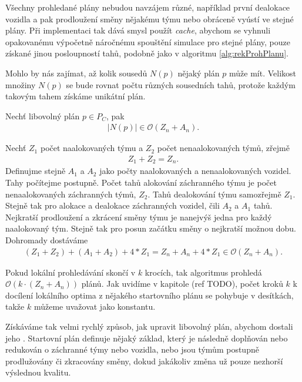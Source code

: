Všechny prohledané plány nebudou navzájem různé,
například první dealokace vozidla a pak prodloužení směny nějakému týmu nebo obráceně vyústí ve stejné plány.
Při implementaci tak dává smysl použít \textit{cache},
abychom se vyhnuli opakovanému výpočetně náročnému spouštění simulace pro stejné plány, pouze získané jinou posloupností tahů, podobně jako v algoritmu \ref{alg:rekProhPlanu}.

Mohlo by nás zajímat, až kolik sousedů $N(p)$ nějaký plán $p$ může mít.
Velikost množiny $N(p)$ se bude rovnat počtu různých sousedních tahů, 
protože každým takovým tahem získáme unikátní plán. 

\begin{veta}
  Nechť libovolný plán $p \in P_C$, pak
  \begin{align*}
    |N(p)| \in \mathcal{O}(Z_n + A_n).
  \end{align*}
\end{veta}
\begin{dukaz}
  Nechť $Z_1$ počet naalokovaných týmu a $Z_2$ počet nenaalokovaných týmů, zřejmě
  \begin{align*}
    Z_1 + Z_2 = Z_n.
  \end{align*}
  Definujme stejně $A_1$ a $A_2$ jako počty naalokovaných a nenaalokovaných vozidel.
  Tahy počítejme postupně.
  Počet tahů alokování záchranného týmu je počet nenaalokovaných záchranných týmů, $Z_2$.
  Tahů dealokování týmu samozřejmě $Z_1$.
  Stejně tak pro alokace a dealokace záchranných vozidel, čili $A_2$ a $A_1$ tahů.
  Nejkratší prodloužení a zkrácení směny týmu je nanejvýš jedna pro každý naalokovaný tým.
  Stejně tak pro posun začátku směny o nejkratší možnou dobu.
  Dohromady dostáváme
  \begin{align*}
    (Z_1 + Z_2) + (A_1 + A_2) + 4 * Z_1 = Z_n + A_n + 4 * Z_1 \in \mathcal{O}(Z_n + A_n).
  \end{align*}
\end{dukaz}

Pokud lokální prohledávání skončí v $k$ krocích, tak algoritmus prohledá $\mathcal{O}(k \cdot (Z_n + A_n))$ plánů.
Jak uvidíme v kapitole (ref TODO), počet kroků $k$ k docílení lokálního optima z nějakého startovního plánu se pohybuje v desítkách,
takže $k$ můžeme uvažovat jako konstantu.

Získáváme tak velmi rychlý způsob, jak upravit libovolný plán, abychom dostali jeho . 
Startovní plán definuje nějaký základ, který je následně doplňován nebo redukován o záchranné týmy nebo vozidla,
nebo jsou týmům postupně prodlužovány či zkracovány směny,
dokud jakákoliv změna už pouze nezhorší výslednou kvalitu. 

